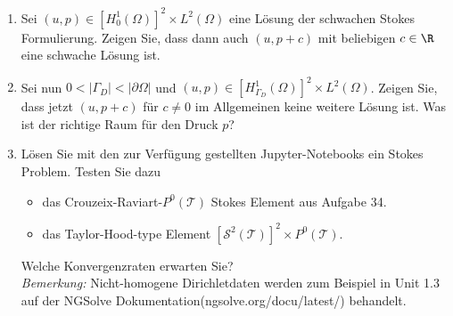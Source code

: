 
\begin{exercise}

\phantom{}

\begin{enumerate}[label = \textbf{\alph*)}]
  \item Sei $(u,p) \in [H_0^1(\Omega)]^2 \times L^2(\Omega)$ eine Lösung der
  schwachen Stokes Formulierung. Zeigen Sie, dass dann auch $(u, p + c)$ mit
  beliebigen $c \in \R$ eine schwache Lösung ist.
  \item Sei nun $0 < |\Gamma_D| < |\partial\Omega|$ und
  $(u,p) \in [H_{\Gamma_D}^1(\Omega)]^2 \times L^2(\Omega)$. Zeigen Sie, dass
  jetzt $(u, p + c)$ für $c \neq 0$ im Allgemeinen keine weitere Lösung ist.
  Was ist der richtige Raum für den Druck $p$?
  \item Lösen Sie mit den zur Verfügung gestellten Jupyter-Notebooks ein
  Stokes Problem. Testen Sie dazu
  \begin{itemize}
    \item das Crouzeix-Raviart-$P^0(\mathcal{T})$ Stokes Element aus Aufgabe 34.
    \item das Taylor-Hood-type Element $[\mathcal{S}^2(\mathcal{T})]^2 \times P^0(\mathcal{T})$.
  \end{itemize}
  Welche Konvergenzraten erwarten Sie? \\
  \textit{Bemerkung:} Nicht-homogene Dirichletdaten werden zum Beispiel in
  Unit 1.3 auf der NGSolve Dokumentation(ngsolve.org/docu/latest/) behandelt.
\end{enumerate}

\end{exercise}


